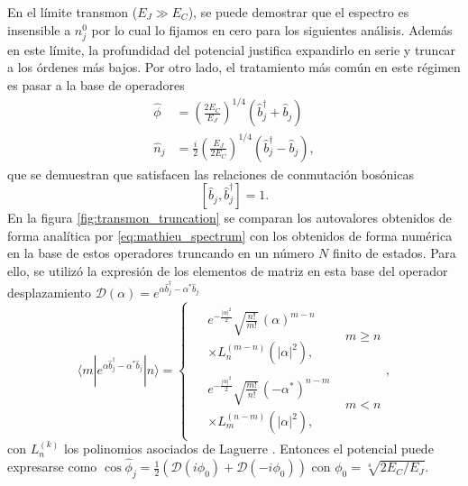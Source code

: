 En el límite transmon ($E_J \gg E_C$), se puede demostrar que el espectro es insensible a $n_j^0$ por lo cual lo fijamos en cero para los siguientes análisis. Además en este límite, la profundidad del potencial justifica expandirlo en serie y truncar a los órdenes más bajos. Por otro lado, el tratamiento más común en este régimen es pasar a la base de operadores
\begin{subequations}
    \begin{align}
        \hat \phi &= \left(\frac{2E_C}{E_J}\right)^{1/4}(\hat b^\dag_j + \hat b_j)\\
        \hat n_j &= \frac{i}{2}\left(\frac{E_J}{2E_C}\right)^{1/4}(\hat b^\dag_j - \hat b_j),
    \end{align}
\end{subequations}
que se demuestran que satisfacen las relaciones de conmutación bosónicas
\begin{equation}
    \left[\hat b_j, \hat b_j^\dag\right] = 1.
\end{equation}
En la figura \ref{fig:transmon_truncation} se comparan los autovalores obtenidos de forma analítica por \eqref{eq:mathieu_spectrum} con los obtenidos de forma numérica en la base de estos operadores truncando en un número $N$ finito de estados. Para ello, se utilizó la expresión de los elementos de matriz en esta base del operador desplazamiento $\mathcal D(\alpha) = e^{\alpha \hat b_j^\dag - \alpha^*\hat b_j}$
\begin{equation}
    \langle m | e^{\alpha \hat b_j^\dag - \alpha^*\hat b_j} | n \rangle =
        \begin{cases}
            \begin{aligned}
            & e^{-\frac{|\alpha|^2}{2}} \sqrt{\frac{n!}{m!}} \, (\alpha)^{m-n} \\
            & \times L_n^{(m-n)}(|\alpha|^2),
            \end{aligned} & m \ge n \\[1ex]
            \begin{aligned}
            & e^{-\frac{|\alpha|^2}{2}} \sqrt{\frac{m!}{n!}} \, (-\alpha^*)^{n-m} \\
            & \times L_m^{(n-m)}(|\alpha|^2),
            \end{aligned} & m < n
        \end{cases},
\end{equation}
con $L_n^{(k)}$ los polinomios asociados de Laguerre \cite{walls2008Quantum}. Entonces el potencial puede expresarse como $\cos \hat \phi_j = \frac{1}{2}\left(\mathcal D(i\phi_{\text{0}}) + \mathcal D(-i\phi_{\text{0}})\right)$ con $\phi_0 = \sqrt[4]{2E_C / E_J}$.
